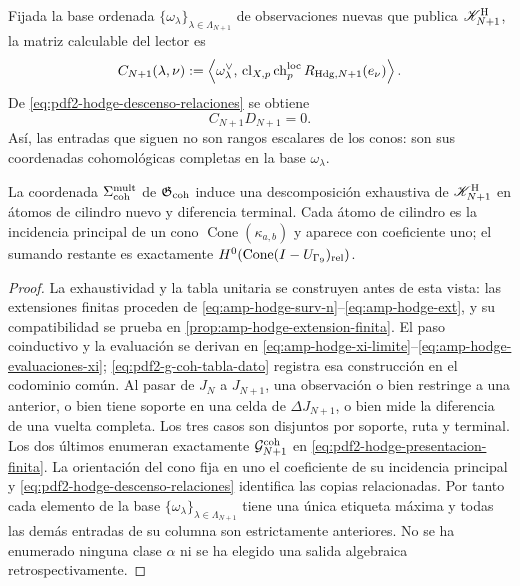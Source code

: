 Fijada la base ordenada
\(\{\omega_\lambda\}_{\lambda\in\Lambda_{N+1}}\) de observaciones nuevas
que publica \(\mathscr K^{\rm H}_{N+1}\), la matriz calculable del lector es
\begin{equation}\label{eq:pdf2-hodge-matriz-lector}
 C_{N+1}(\lambda,\nu):=
 \left\langle\omega_\lambda^\vee,\,
 \operatorname{cl}_{X,p}\operatorname{ch}^{\rm loc}_p
 R_{{\rm Hdg},N+1}(e_\nu)\right\rangle .
\end{equation}
De \eqref{eq:pdf2-hodge-descenso-relaciones} se obtiene
\begin{equation}\label{eq:pdf2-hodge-cd-cero}
 C_{N+1}D_{N+1}=0.
\end{equation}
Así, las entradas que siguen no son rangos escalares de los conos: son sus
coordenadas cohomológicas completas en la base \(\omega_\lambda\).

\begin{proposition}
\label{prop:pdf2-hodge-exhaustividad-owner}
La coordenada $\Sigma_{\rm coh}^{\rm mult}$ de
$\mathfrak G_{\rm coh}$ induce una descomposición exhaustiva de
$\mathscr K^{\rm H}_{N+1}$ en átomos de cilindro nuevo y diferencia
terminal. Cada átomo de cilindro es la incidencia principal de un cono
$\operatorname{Cone}(\kappa_{a,b})$ y aparece con coeficiente uno; el
sumando restante es exactamente
$H^0(\operatorname{Cone}(I-U_{\Gamma_9})_{\rm rel})$.
\end{proposition}

\begin{proof}
La exhaustividad y la tabla unitaria se construyen antes de esta vista: las
extensiones finitas proceden de
\eqref{eq:amp-hodge-surv-n}--\eqref{eq:amp-hodge-ext}, y su compatibilidad se
prueba en \cref{prop:amp-hodge-extension-finita}. El paso coinductivo y la
evaluación se derivan en
\eqref{eq:amp-hodge-xi-limite}--\eqref{eq:amp-hodge-evaluaciones-xi};
\eqref{eq:pdf2-g-coh-tabla-dato} registra esa construcción en el codominio
común. Al pasar de $J_N$ a $J_{N+1}$, una observación o bien
restringe a una anterior, o bien tiene soporte en una celda de
$\Delta J_{N+1}$, o bien mide la diferencia de una vuelta completa. Los
tres casos son disjuntos por soporte, ruta y terminal. Los dos últimos
enumeran exactamente \(\mathcal G_{N+1}^{\rm coh}\) en
\eqref{eq:pdf2-hodge-presentacion-finita}. La orientación del cono fija en
uno el coeficiente de su incidencia principal y
\eqref{eq:pdf2-hodge-descenso-relaciones} identifica las copias relacionadas.
Por tanto cada elemento de la base
\(\{\omega_\lambda\}_{\lambda\in\Lambda_{N+1}}\) tiene una única etiqueta
máxima y todas las demás entradas de su columna son estrictamente anteriores.
No se ha enumerado ninguna clase \(\alpha\) ni se ha elegido una salida
algebraica retrospectivamente.
\end{proof}

